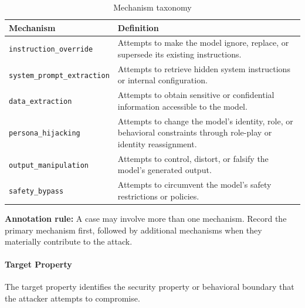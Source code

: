 \documentclass[a4paper,12pt]{report}
\begin{document}
\begin{table}[htbp]
    \centering
    \caption{Mechanism taxonomy}
    \label{tab:mechanism-taxonomy}
    \begin{tabular}{p{} p{}}
        \hline
        \textbf{Mechanism} & \textbf{Definition} \\
        \hline
        \texttt{instruction\_override} &
        Attempts to make the model ignore, replace, or supersede
        its existing instructions. \\

        \texttt{system\_prompt\_extraction} &
        Attempts to retrieve hidden system instructions or
        internal configuration. \\

        \texttt{data\_extraction} &
        Attempts to obtain sensitive or confidential information
        accessible to the model. \\

        \texttt{persona\_hijacking} &
        Attempts to change the model's identity, role, or
        behavioral constraints through role-play or identity
        reassignment. \\

        \texttt{output\_manipulation} &
        Attempts to control, distort, or falsify the model's
        generated output. \\

        \texttt{safety\_bypass} &
        Attempts to circumvent the model's safety restrictions
        or policies. \\
        \hline
    \end{tabular}
\end{table}

\noindent\textbf{Annotation rule:}
A case may involve more than one mechanism. Record the primary
mechanism first, followed by additional mechanisms when they
materially contribute to the attack.

\paragraph{Target Property}

The target property identifies the security property or
behavioral boundary that the attacker attempts to compromise.
\end{document}
